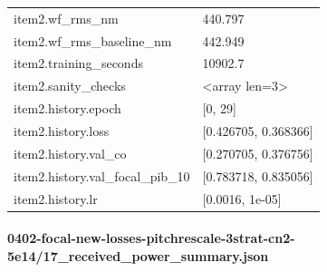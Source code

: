 \begin{longtable}{p{}p{}}
item2.wf\_rms\_nm & 440.797\\
item2.wf\_rms\_baseline\_nm & 442.949\\
item2.training\_seconds & 10902.7\\
item2.sanity\_checks & <array len=3>\\
item2.history.epoch & [0, 29]\\
item2.history.loss & [0.426705, 0.368366]\\
item2.history.val\_co & [0.270705, 0.376756]\\
item2.history.val\_focal\_pib\_10 & [0.783718, 0.835056]\\
item2.history.lr & [0.0016, 1e-05]\\
\end{longtable}

\paragraph{0402-focal-new-losses-pitchrescale-3strat-cn2-5e14/17\_received\_power\_summary.json}
